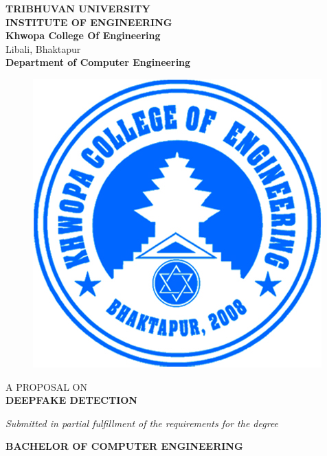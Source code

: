     \begin{center}
		\thispagestyle{empty}
		\Large\textbf{TRIBHUVAN UNIVERSITY}\\
		\Large\textbf{INSTITUTE OF ENGINEERING }\\
		\vspace{0.2in}
		\large{\textbf{Khwopa College Of Engineering}\\}
		\normalsize{Libali, Bhaktapur\\}
		\large\textbf{Department of Computer Engineering}
		\vspace{0.2in}
		\begin{figure}[h]
		    \centering
			    \includegraphics{img/Khwopalogo.jpg}
		\end{figure}
		
		\vspace{0.2in}
		\large{A PROPOSAL ON\\\textbf{DEEPFAKE DETECTION}\\}
		
		\vspace{0.2in}
		\large{\textit{Submitted in partial fulfillment of the requirements for the degree\\}}
		
		\vspace{0.2in}
		\large{\textbf{BACHELOR OF COMPUTER ENGINEERING}\\}
		

\end{center}
